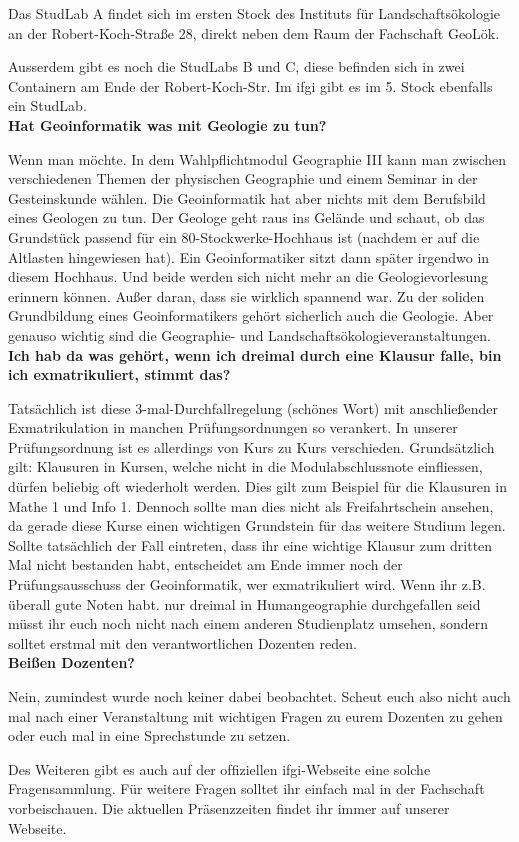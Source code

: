 Das StudLab A findet sich im ersten Stock des Instituts für Landschaftsökologie an der Robert-Koch-Straße 28, direkt neben dem Raum der Fachschaft GeoLök.

Ausserdem gibt es noch die StudLabs B und C, diese befinden sich in zwei Containern am Ende der Robert-Koch-Str. Im ifgi gibt es im 5. Stock ebenfalls ein StudLab.\\

\textbf{Hat Geoinformatik was mit Geologie zu tun?}

Wenn man möchte. In dem Wahlpﬂichtmodul Geographie III kann man zwischen verschiedenen Themen der physischen Geographie und einem Seminar in der Gesteinskunde wählen. Die Geoinformatik hat aber nichts mit dem Berufsbild eines Geologen zu tun. Der Geologe geht raus ins Gelände und schaut, ob das Grundstück passend für ein 80-Stockwerke-Hochhaus ist (nachdem er auf die Altlasten hingewiesen hat). Ein Geoinformatiker sitzt dann später irgendwo in diesem Hochhaus. Und beide werden sich nicht mehr an die Geologievorlesung erinnern können. Außer daran, dass sie wirklich spannend war. Zu der soliden Grundbildung eines Geoinformatikers gehört sicherlich auch die Geologie. Aber genauso wichtig sind die Geographie- und Landschaftsökologieveranstaltungen.\\

\textbf{Ich hab da was gehört, wenn ich dreimal durch eine Klausur falle, bin ich exmatrikuliert, stimmt das?}

Tatsächlich ist diese 3-mal-Durchfallregelung (schönes Wort) mit anschließender Exmatrikulation in manchen Prüfungsordnungen so verankert. In unserer Prüfungsordnung ist es allerdings von Kurs zu Kurs verschieden. Grundsätzlich gilt: Klausuren in Kursen, welche nicht in die Modulabschlussnote einfliessen, dürfen beliebig oft wiederholt werden. Dies gilt zum Beispiel für die Klausuren in Mathe 1 und Info 1. Dennoch sollte man dies nicht als Freifahrtschein ansehen, da gerade diese Kurse einen wichtigen Grundstein für das weitere Studium legen.
Sollte tatsächlich der Fall eintreten, dass ihr eine wichtige Klausur zum dritten Mal nicht bestanden habt, entscheidet am Ende immer noch der Prüfungsausschuss der Geoinformatik, wer exmatrikuliert wird. Wenn ihr z.B. überall gute Noten habt. nur dreimal in Humangeographie durchgefallen seid müsst ihr euch noch nicht nach einem anderen Studienplatz umsehen, sondern solltet erstmal mit den verantwortlichen Dozenten reden.\\

\textbf{Beißen Dozenten?}

Nein, zumindest wurde noch keiner dabei beobachtet. Scheut euch also nicht auch mal nach einer Veranstaltung mit wichtigen Fragen zu eurem Dozenten zu gehen oder euch mal in eine Sprechstunde zu setzen.

Des Weiteren gibt es auch auf der ofﬁziellen ifgi-Webseite eine solche Fragensammlung. Für weitere Fragen solltet ihr einfach mal in der Fachschaft vorbeischauen. Die aktuellen Präsenzzeiten ﬁndet ihr immer auf unserer Webseite.

